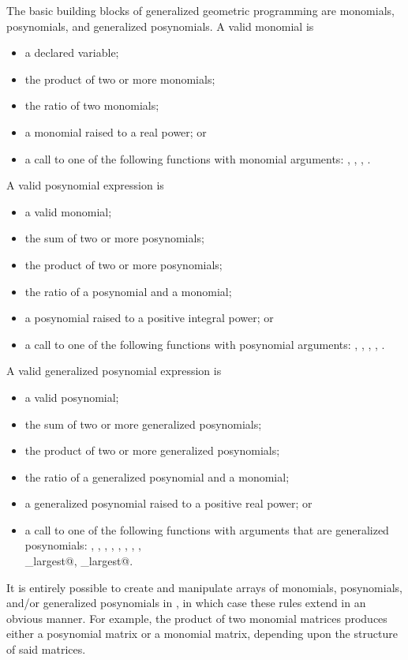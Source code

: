 \documentclass[12pt]{article}
\begin{document}
The basic building blocks of generalized geometric programming are
monomials, posynomials, and generalized posynomials. A valid monomial is
\begin{itemize}
\item a declared variable;
\item the product of two or more monomials;
\item the ratio of two monomials;
\item a monomial raised to a real power; or
\item a call to one of the following functions with monomial arguments:
      \verb@prod@, \verb@cumprod@, \verb@geomean@, \verb@sqrt@.
\end{itemize}
A valid posynomial expression is
\begin{itemize}
\item a valid monomial;
\item the sum of two or more posynomials;
\item the product of two or more posynomials;
\item the ratio of a posynomial and a monomial;
\item a posynomial raised to a positive integral power; or
\item a call to one of the following functions with posynomial arguments:
      \verb@sum@, \verb@cumsum@, \verb@mean@, \verb@prod@, \verb@cumprod@.
\end{itemize}
A valid generalized posynomial expression is
\begin{itemize}
\item a valid posynomial;
\item the sum of two or more generalized posynomials;
\item the product of two or more generalized posynomials;
\item the ratio of a generalized posynomial and a monomial;
\item a generalized posynomial raised to a positive real power; or
\item a call to one of the following functions with arguments
      that are generalized posynomials: \verb@sum@, \verb@cumsum@,
      \verb@mean@, \verb@prod@, \verb@cumprod@, \verb@geomean@,
      \verb@sqrt@, \verb@norm@, \\ \verb@sum_largest@, \verb@norm_largest@.
\end{itemize}
It is entirely possible to create and manipulate arrays of monomials,
posynomials, and/or generalized posynomials in \cvx, in which case these
rules extend in an obvious manner. For example, the product of two
monomial matrices produces either a posynomial matrix or a monomial 
matrix, depending upon the structure of said matrices.
\end{document}
